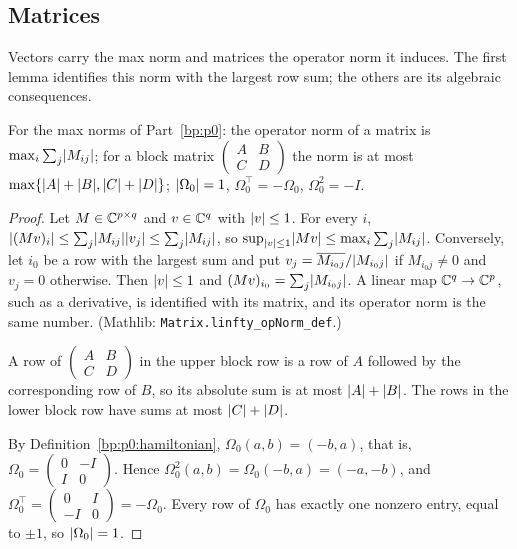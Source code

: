 \subsection{Matrices}\label{bp:p1:sec-matrices}

Vectors carry the max norm and matrices the operator norm it induces. The first lemma identifies this
norm with the largest row sum; the others are its algebraic consequences.

\begin{lemma}\label{bp:p1:operator-norms}
For the max norms of Part~\ref{bp:p0}: the operator norm of a matrix is $\max_i\sum_j\lvert M_{ij}\rvert$; for a block
matrix $\left(\begin{smallmatrix}A&B\\C&D\end{smallmatrix}\right)$ the norm is at most $\max\{\lvert A\rvert+\lvert B\rvert,\lvert C\rvert+\lvert D\rvert\}$;
$\lvert \Omega_0\rvert=1$, $\Omega_0^\top=-\Omega_0$, $\Omega_0^2=-I$.
\end{lemma}

\begin{proof}
\label{step:p1:opn-rowsum}
Let $M\in\mathbb{C}^{p\times q}$ and $v\in\mathbb{C}^q$ with $\lvert v\rvert\le1$. For every $i$,
$\lvert (Mv)_i\rvert\le\sum_j\lvert M_{ij}\rvert\lvert v_j\rvert\le\sum_j\lvert M_{ij}\rvert$, so
$\sup_{\lvert v\rvert\le1}\lvert Mv\rvert\le\max_i\sum_j\lvert M_{ij}\rvert$. Conversely, let $i_0$ be a row with the largest
sum and put $v_j=\overline{M_{i_0j}}/\lvert M_{i_0j}\rvert$ if $M_{i_0j}\ne0$ and $v_j=0$ otherwise. Then
$\lvert v\rvert\le1$ and $(Mv)_{i_0}=\sum_j\lvert M_{i_0j}\rvert$. A linear map $\mathbb{C}^q\to\mathbb{C}^p$, such as a derivative, is
identified with its matrix, and its operator norm is the same number.
(Mathlib: \nolinkurl{Matrix.linfty_opNorm_def}.)

\label{step:p1:opn-blocks}
A row of $\left(\begin{smallmatrix}A&B\\C&D\end{smallmatrix}\right)$ in the upper block row is a row of
$A$ followed by the corresponding row of $B$, so its absolute sum is at most $\lvert A\rvert+\lvert B\rvert$. The rows
in the lower block row have sums at most $\lvert C\rvert+\lvert D\rvert$.

\label{step:p1:opn-omega}
By Definition~\ref{bp:p0:hamiltonian}, $\Omega_0(a,b)=(-b,a)$, that is,
$\Omega_0=\left(\begin{smallmatrix}0&-I\\I&0\end{smallmatrix}\right)$. Hence
$\Omega_0^2(a,b)=\Omega_0(-b,a)=(-a,-b)$, and
$\Omega_0^\top=\left(\begin{smallmatrix}0&I\\-I&0\end{smallmatrix}\right)=-\Omega_0$. Every row of
$\Omega_0$ has exactly one nonzero entry, equal to $\pm1$, so $\lvert \Omega_0\rvert=1$.
\end{proof}

